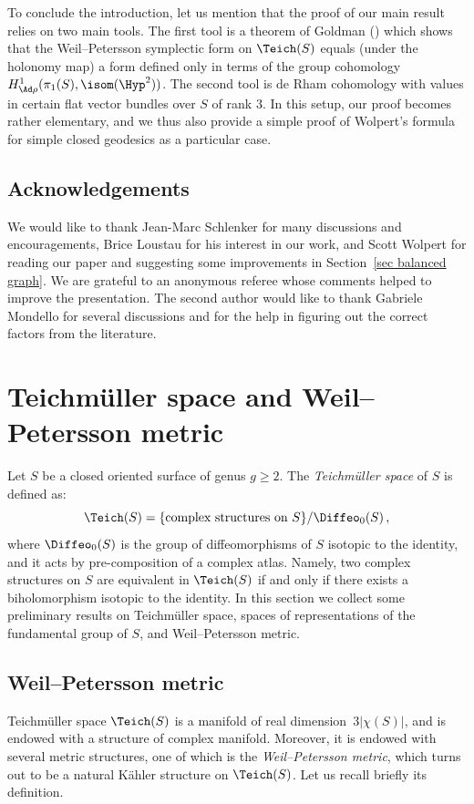 To conclude the introduction, let us mention that the proof of our main result relies on two main tools. The first tool is a theorem of Goldman (\cite{Goldman}) which shows that the Weil--Petersson symplectic form on $\Teich(S)$ equals (under the holonomy map) a form defined only in terms of the group cohomology $H^1_{\Ad\rho}(\pi_1(S),\isom(\Hyp^2))$. The second tool is de Rham cohomology with values in certain flat vector bundles over $S$ of rank $3$. In this setup, our proof becomes rather elementary, and we thus also provide a simple proof of Wolpert's formula for simple closed geodesics as a particular case.

\subsection*{Acknowledgements}
We would like to thank Jean-Marc Schlenker for many discussions and encouragements, Brice Loustau for his interest in our work, and Scott Wolpert for reading our paper and suggesting some improvements in Section~\ref{sec balanced graph}. We are grateful to an anonymous referee whose comments helped to improve the presentation. The second author would like to thank Gabriele Mondello for several discussions and for the help in figuring out the correct factors from the literature.



\section{Teichm\"uller space and Weil--Petersson metric}

Let $S$ be a closed oriented surface of genus $g\geq 2$. The \emph{Teichm\"uller space} of $S$ is defined as:
\[
\Teich (S)=\{\text{complex structures on }S\}/\Diffeo_0(S)\,,
\]
where $\Diffeo_0(S)$ is the group of diffeomorphisms of $S$ isotopic to the identity, and it acts by pre-composition of a complex atlas. Namely, two complex structures on $S$ are equivalent in $\Teich (S)$ if and only if there exists a biholomorphism isotopic to the identity. In this section we collect some preliminary results on Teichm\"uller space, spaces of representations of the fundamental group of $S$, and Weil--Petersson metric.


\subsection{Weil--Petersson metric}

Teichm\"uller space $\Teich(S)$ is a manifold of real dimension~$3|\chi(S)|$, and is endowed with a structure of complex manifold. Moreover, it is endowed with several metric structures, one of which is the \emph{Weil--Petersson metric}, which turns out to be a natural K\"ahler structure on $\Teich(S)$. Let us recall briefly its definition.

